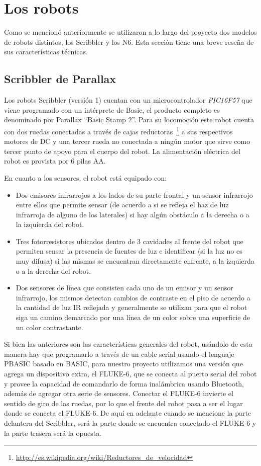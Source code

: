 \section{Los robots}
Como se mencionó anteriormente se utilizaron a lo largo del proyecto dos
modelos de robots distintos, los Scribbler y los N6. Esta sección tiene una
breve reseña de sus características técnicas.

\subsection{Scribbler de Parallax}
Los robots Scribbler (versión 1) cuentan con un microcontrolador
\textit{PIC16F57} que viene programado con un intérprete de Basic, el producto
completo es denominado por Parallax ``Basic Stamp 2''.
Para su locomoción este robot cuenta con dos ruedas conectadas a través de
cajas
reductoras~\footnote{\url{http://es.wikipedia.org/wiki/Reductores_de_velocidad}}
a sus respectivos motores de DC y una tercer rueda no conectada a ningún
motor que sirve como tercer punto de apoyo para el cuerpo del robot.
La alimentación eléctrica del robot es provista por 6 pilas AA.

En cuanto a los sensores, el robot está equipado con:
\begin{itemize}
    \item Dos emisores infrarrojos a los lados de su parte frontal y un
        sensor infrarrojo entre ellos que permite sensar (de acuerdo a si se
        refleja el haz de luz infrarroja de alguno de los laterales) si
        hay algún obstáculo a la derecha o a la izquierda del robot.
    \item Tres fotorresistores ubicados dentro de 3 cavidades al frente del
        robot que permiten sensar la presencia de fuentes de luz e
        identificar (si la luz no es muy difusa) si las mismas se encuentran
        directamente enfrente, a la izquierda o a la derecha del robot.
    \item Dos sensores de línea que consisten cada uno de un emisor
        y un sensor infrarrojo, los mismos detectan cambios de contraste
        en el piso de acuerdo a la cantidad de luz IR reflejada y generalmente
        se utilizan para que el robot siga un camino demarcado por una línea
        de un color sobre una superficie de un color contrastante.
\end{itemize}

Si bien las anteriores son las características generales del robot, usándolo
de esta manera hay que programarlo a través de un cable serial usando el
lenguaje PBASIC basado en BASIC, para nuestro proyecto utilizamos una versión
que agrega un dispositivo extra, el FLUKE-6, que se conecta al puerto
serial del robot y provee la capacidad de comandarlo de forma inalámbrica
usando Bluetooth, además de agregar otra serie de sensores. Conectar el
FLUKE-6 invierte el sentido de giro de las ruedas, por lo que el frente
del robot pasa a ser el lugar donde se conecta el FLUKE-6. De aquí
en adelante cuando se mencione la parte delantera del Scribbler, será la
parte donde se encuentra conectado el FLUKE-6 y la parte trasera será la
opuesta.

